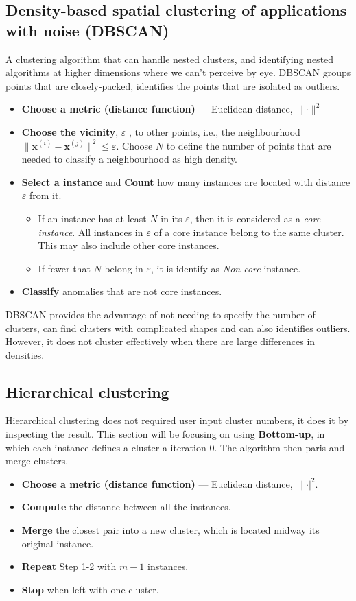\documentclass[a4paper,10pt]{article}
\begin{document}
\subsection{Density-based spatial clustering of applications with noise (DBSCAN)}
A clustering algorithm that can handle nested clusters, and identifying nested algorithms at higher dimensions where we can't perceive by eye. DBSCAN groups points that are closely-packed, identifies the points that are isolated as outliers. 
\begin{itemize}
    \item \textbf{Choose a metric (distance function)} --- Euclidean distance, $\lVert\cdot\rVert^2$
    \item \textbf{Choose the vicinity}, $\varepsilon$ , to other points, i.e., the neighbourhood $\lVert\pmb{x}^{(i)}-\pmb{x}^{(j)}\rVert^2\leq\varepsilon$. Choose $N$ to define the number of points that are needed to classify a neighbourhood as high density. 
    \item \textbf{Select a instance} and \textbf{Count} how many instances are located with distance $\varepsilon$ from it. 
    \begin{itemize}
        \item If an instance has at least $N$ in its $\varepsilon$, then it is considered as a \textit{core instance}. All instances in $\varepsilon$ of a core instance belong to the same cluster. This may also include other core instances. 
        \item If fewer that $N$ belong in $\varepsilon$, it is identify as \textit{Non-core} instance. 
    \end{itemize}
    \item \textbf{Classify} anomalies that are not core instances. 
\end{itemize}

DBSCAN provides the advantage of not needing to specify the number of clusters, can find clusters with complicated shapes and can also identifies outliers. However, it does not cluster effectively when there are large differences in densities. 


\subsection{Hierarchical clustering}
Hierarchical clustering does not required user input cluster numbers, it does it by inspecting the result. This section will be focusing on using \textbf{Bottom-up}, in which each instance defines a cluster a iteration 0. The algorithm then paris and merge clusters. 
\begin{itemize}
    \item \textbf{Choose a metric (distance function)} --- Euclidean distance, $\lVert\cdot\rvert^2$.
    \item \textbf{Compute} the distance between all the instances. 
    \item \textbf{Merge} the closest pair into a new cluster, which is located midway its original instance. 
    \item \textbf{Repeat} Step 1-2 with $m-1$ instances. 
    \item \textbf{Stop} when left with one cluster.  
\end{itemize}
\end{document}
